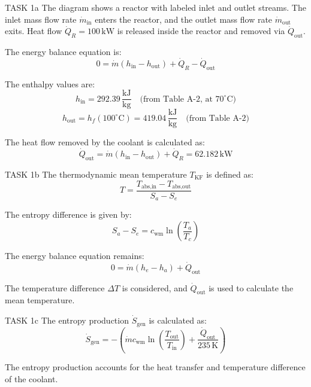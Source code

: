 TASK 1a  
The diagram shows a reactor with labeled inlet and outlet streams. The inlet mass flow rate \( \dot{m}_{\text{in}} \) enters the reactor, and the outlet mass flow rate \( \dot{m}_{\text{out}} \) exits. Heat flow \( \dot{Q}_R = 100 \, \text{kW} \) is released inside the reactor and removed via \( \dot{Q}_{\text{out}} \).  

The energy balance equation is:  
\[
0 = \dot{m} (h_{\text{in}} - h_{\text{out}}) + \dot{Q}_R - \dot{Q}_{\text{out}}
\]  

The enthalpy values are:  
\[
h_{\text{in}} = 292.39 \, \frac{\text{kJ}}{\text{kg}} \quad \text{(from Table A-2, at } 70^\circ\text{C}\text{)}
\]  
\[
h_{\text{out}} = h_f(100^\circ\text{C}) = 419.04 \, \frac{\text{kJ}}{\text{kg}} \quad \text{(from Table A-2)}
\]  

The heat flow removed by the coolant is calculated as:  
\[
\dot{Q}_{\text{out}} = \dot{m} (h_{\text{in}} - h_{\text{out}}) + \dot{Q}_R = 62.182 \, \text{kW}
\]  

TASK 1b  
The thermodynamic mean temperature \( T_{\text{KF}} \) is defined as:  
\[
T = \frac{T_{\text{abs,in}} - T_{\text{abs,out}}}{S_a - S_e}
\]  

The entropy difference is given by:  
\[
S_a - S_e = c_{\text{wm}} \ln \left( \frac{T_a}{T_c} \right)
\]  

The energy balance equation remains:  
\[
0 = \dot{m} (h_e - h_a) + \dot{Q}_{\text{out}}
\]  

The temperature difference \( \Delta T \) is considered, and \( \dot{Q}_{\text{out}} \) is used to calculate the mean temperature.  

TASK 1c  
The entropy production \( \dot{S}_{\text{gen}} \) is calculated as:  
\[
\dot{S}_{\text{gen}} = - \left( \dot{m} c_{\text{wm}} \ln \left( \frac{T_{\text{out}}}{T_{\text{in}}} \right) + \frac{\dot{Q}_{\text{out}}}{235 \, \text{K}} \right)
\]  

The entropy production accounts for the heat transfer and temperature difference of the coolant.